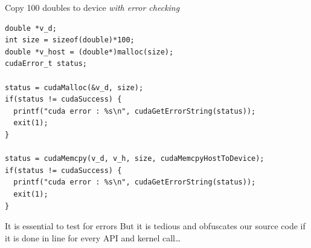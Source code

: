 \begin{frame}[fragile]{}

    \begin{code}{Copy 100 doubles to device \emph{with error checking}}
        \begin{lstlisting}[style=boxcudatiny]
double *v_d;
int size = sizeof(double)*100;
double *v_host = (double*)malloc(size);
cudaError_t status;

status = cudaMalloc(&v_d, size);
if(status != cudaSuccess) {
  printf("cuda error : %s\n", cudaGetErrorString(status));
  exit(1);
}

status = cudaMemcpy(v_d, v_h, size, cudaMemcpyHostToDevice);
if(status != cudaSuccess) {
  printf("cuda error : %s\n", cudaGetErrorString(status));
  exit(1);
}
        \end{lstlisting}
    \end{code}

    \begin{info}{It is essential to test for errors}
        But it is tedious and obfuscates our source code if it is done in line for every API and kernel call\ldots
    \end{info}
\end{frame}

